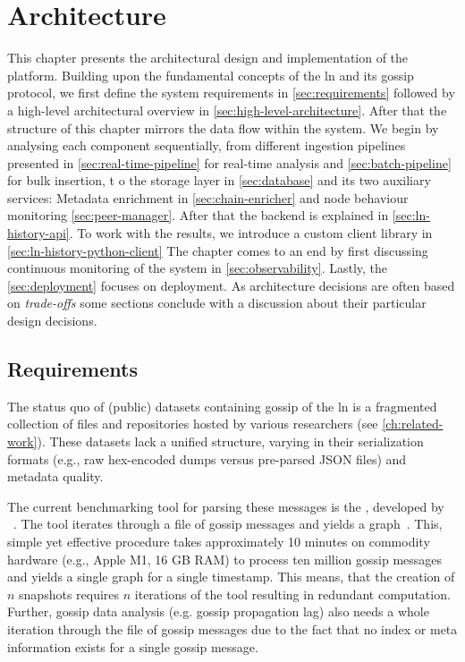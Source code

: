 \chapter{Architecture}
\label{ch:architecture}

This chapter presents the architectural design and implementation of the  platform. 
Building upon the fundamental concepts of the \gls{ln} and its gossip protocol, 
we first define the system requirements in \autoref{sec:requirements} 
followed by a high-level architectural overview in \autoref{sec:high-level-architecture}.
After that the structure of this chapter mirrors the data flow within the system.
We begin by analysing each component sequentially, 
from different ingestion pipelines presented in \autoref{sec:real-time-pipeline} for
real-time analysis and \autoref{sec:batch-pipeline} for bulk insertion, t
o the storage layer in \autoref{sec:database} and its two auxiliary services:
Metadata enrichment in \autoref{sec:chain-enricher} and node behaviour monitoring \autoref{sec:peer-manager}.
After that the backend  is explained in \autoref{sec:ln-history-api}.
To work with the results, we introduce a custom client library in \autoref{sec:ln-history-python-client}
The chapter comes to an end by first discussing continuous monitoring of the system in \autoref{sec:observability}.
Lastly, the \autoref{sec:deployment} focuses on deployment.
As architecture decisions are often based on \textit{trade-offs} some sections
conclude with a discussion about their particular design decisions. 


\section{Requirements}
\label{sec:requirements}

The status quo of (public) datasets containing gossip of the \gls{ln} is a fragmented collection
of files and repositories hosted by various researchers (see \autoref{ch:related-work}). 
These datasets lack a unified structure, varying in their serialization formats 
(e.g., raw hex-encoded dumps versus pre-parsed JSON files) and metadata quality.

The current benchmarking tool for parsing these messages is the ,
developed by \citeauthor{decker_lnresearch_2020}~\cite{decker_lnresearch_2020}.
The  tool iterates through a file of gossip messages and yields a  graph~\cite{hagberg_exploring_2008}.
This, simple yet effective procedure takes approximately 10 minutes on commodity hardware (e.g., Apple M1, 16 GB RAM) 
to process ten million gossip messages and yields a single graph for a single timestamp.
This means, that the creation of $n$ snapshots requires $n$ iterations of the  tool
resulting in redundant computation.  
Further, gossip data analysis (e.g. gossip propagation lag) also needs a whole iteration through the file of gossip messages
due to the fact that no index or meta information exists for a single gossip message.

